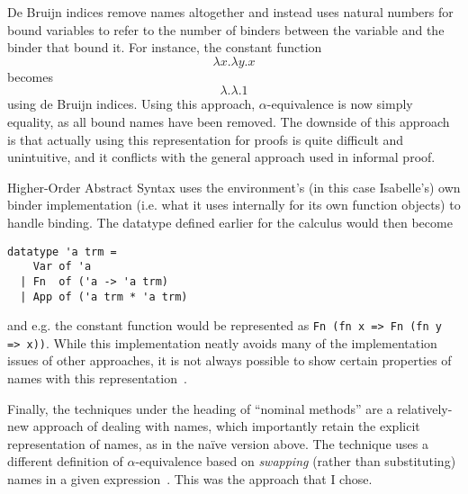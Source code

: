 De Bruijn indices remove names altogether and instead uses natural numbers for bound variables to refer to the number of binders between the variable and the binder that bound it.
For instance, the constant function
\[
\lambda x. \lambda y. x
\]
becomes
\[
\lambda.\lambda. 1
\]
using de Bruijn indices.
Using this approach, \(\alpha\)-equivalence is now simply equality, as all bound names have been removed.
The downside of this approach is that actually using this representation for proofs is quite difficult and unintuitive, and it conflicts with the general approach used in informal proof.

Higher-Order Abstract Syntax uses the environment's (in this case Isabelle's) own binder implementation (i.e. what it uses internally for its own function objects) to handle binding.
The datatype defined earlier for the calculus would then become
\begin{verbatim}
datatype 'a trm =
    Var of 'a
  | Fn  of ('a -> 'a trm)
  | App of ('a trm * 'a trm)
\end{verbatim}
and e.g. the constant function would be represented as \texttt{Fn (fn x => Fn (fn y => x))}.
While this implementation neatly avoids many of the implementation issues of other approaches, it is not always possible to show certain properties of names with this representation~\cite{HOAS}.

Finally, the techniques under the heading of ``nominal methods'' are a relatively-new approach of dealing with names, which importantly retain the explicit representation of names, as in the na\"ive version above.
The technique uses a different definition of \(\alpha\)-equivalence based on \emph{swapping} (rather than substituting) names in a given expression~\cite{nominal}.
This was the approach that I chose.

